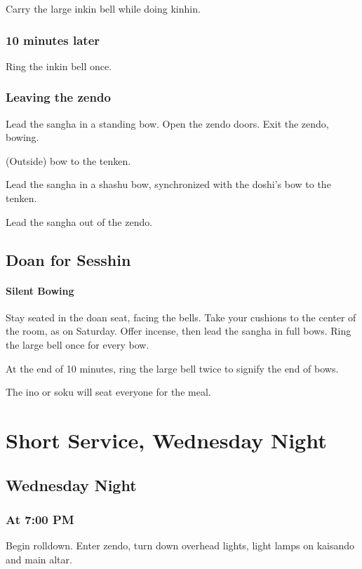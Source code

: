 \documentclass{chantbook}
\begin{document}
Carry the large inkin bell while doing kinhin.

\section*{10 minutes later}

\doan Ring the inkin bell once. \bigspace\zazenbell

\section*{Leaving the zendo}
\doshi Lead the sangha in a standing bow.
\tenken Open the zendo doors.
\doshi Exit the zendo, bowing.

(Outside) bow to the tenken.

\doan Lead the sangha in a shashu bow, synchronized with the doshi's bow to the
tenken.

Lead the sangha out of the zendo.

\chapter{Doan for Sesshin}
\subsection*{Silent Bowing}
\doan Stay seated in the doan seat, facing the bells.
\sangha Take your cushions to the center of the room, as on Saturday.
\doshi Offer incense, then lead the sangha in full bows.
\doan Ring the large bell once for every bow. \bigspace\largebell

At the end of 10 minutes, ring the large bell twice to signify the end of bows.

\bline{\hfill\largebell\hfill\largebell\hfill\null}

The ino or soku will seat everyone for the meal.

\part{Short Service, Wednesday Night}
\chapter{Wednesday Night}
\section*{At 7:00 PM}
\tenken Begin rolldown.
\doan Enter zendo, turn down overhead lights, light lamps on kaisando and main
altar.
\end{document}
